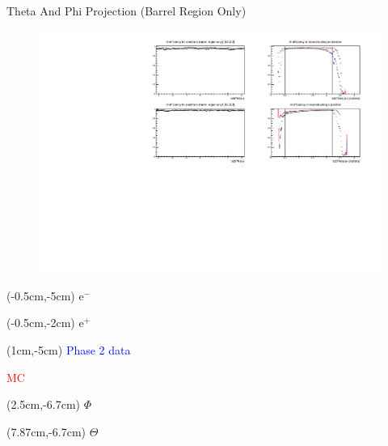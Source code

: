 \documentclass[10pt]{beamer}
\begin{document}
\begin{frame}{Theta And Phi Projection (Barrel Region Only)}
	\begin{figure}
		\centering
		\includegraphics[width=\textwidth]{Plots/Eff/PhiBarrel.pdf}
	\end{figure}
	
	
	\begin{textblock*}{0.3\textwidth}(-0.5cm,-5cm)
		$\textrm{e}^-$
	\end{textblock*}
	\begin{textblock*}{0.3\textwidth}(-0.5cm,-2cm)
		$\textrm{e}^+$
	\end{textblock*}
	
	
\begin{textblock*}{0.5\textwidth}(1cm,-5cm)
	\textcolor{blue}{Phase 2 data}
	
	\textcolor{red}{MC}
	
	
\end{textblock*}
	
		\begin{textblock*}{0.3\textwidth}(2.5cm,-6.7cm)
		$\Phi$
	\end{textblock*}
	
	
	\begin{textblock*}{0.3\textwidth}(7.87cm,-6.7cm)
		$\Theta$
	\end{textblock*}



\end{frame}
\end{document}
